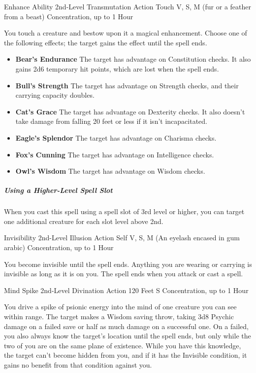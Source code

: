 \documentclass[letterpaper,openany,oneside,twocolumn]{book}
\begin{document}
\DndSpellHeader
  {Enhance Ability}
  {2nd-Level Transmutation}
  {Action}
  {Touch}
  {V, S, M (fur or a feather from a beast)}
  {Concentration, up to 1 Hour}

You touch a creature and bestow upon it a magical enhancement. Choose one of the following effects; the target gains the effect until the spell ends.
\begin{itemize}
	\renewcommand\labelitemi{\textbf{\textbullet}}
	\item \textbf{Bear's Endurance} The target has advantage on Constitution checks. It also gains 2d6 temporary hit points, which are lost when the spell ends.
	\item \textbf{Bull's Strength} The target has advantage on Strength checks, and their carrying capacity doubles.
	\item \textbf{Cat's Grace} The target has advantage on Dexterity checks. It also doesn’t take damage from falling 20 feet or less if it isn't incapacitated.
	\item \textbf{Eagle's Splendor} The target has advantage on Charisma checks.
	\item \textbf{Fox's Cunning} The target has advantage on Intelligence checks.
	\item \textbf{Owl's Wisdom} The target has advantage on Wisdom checks.
\end{itemize}

\subparagraph*{Using a Higher-Level Spell Slot} When you cast this spell using a spell slot of 3rd level or higher, you can target one additional creature for each slot level above 2nd.

\DndSpellHeader
  {Invisibility}
  {2nd-Level Illusion}
  {Action}
  {Self}
  {V, S, M (An eyelash encased in gum arabic)}
  {Concentration, up to 1 Hour}
  
You become invisible until the spell ends. Anything you are wearing or carrying is invisible as long as it is on you. The spell ends when you attack or cast a spell.

\DndSpellHeader
  {Mind Spike}
  {2nd-Level Divination}
  {Action}
  {120 Feet}
  {S}
  {Concentration, up to 1 Hour}
  
You drive a spike of psionic energy into the mind of one creature you can see within range. The target makes a Wisdom saving throw, taking 3d8 Psychic damage on a failed save or half as much damage on a successful one. On a failed, you also always know the target's location until the spell ends, but only while the two of you are on the same plane of existence. While you have this knowledge, the target can't become hidden from you, and if it has the Invisible condition, it gains no benefit from that condition against you.
\end{document}

